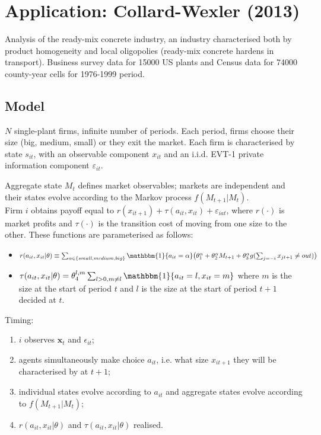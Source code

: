 \documentclass[11pt]{article}
\begin{document}
\section{Application: Collard-Wexler (2013)}

Analysis of the ready-mix concrete industry, an industry characterised both by product homogeneity and local oligopolies (ready-mix concrete hardens in transport).
Business survey data for 15000 US plants and Census data for 74000 county-year cells for 1976-1999 period.

\subsection*{Model}

$N$ single-plant firms, infinite number of periods. Each period, firms choose their size (big, medium, small) or they exit the market. Each firm is characterised by state $s_{it}$, with an observable component $x_{it}$ and an i.i.d. EVT-1 private information component $\varepsilon_{it}$.

Aggregate state $M_t$ defines market observables; markets are independent and their states evolve according to the Markov process $f(M_{t+1}| M_t)$. \\

Firm $i$ obtains payoff equal to $r(x_{it+1}) + \tau(a_{it},x_{it}) + \varepsilon_{iat}$, where $r(\cdot)$ is market profits and $\tau(\cdot)$ is the transition cost of moving from one size to the other. These functions are parameterised as follows:
\begin{itemize}
	\item $r(a_{it}, x_{it} | \theta) \equiv \sum_{\alpha \in \{small, medium, big\}} \mathbbm{1}\{a_{it} = \alpha \}
	\big(\theta^\alpha_1 + \theta^\alpha_2 M_{t+1} + \theta^\alpha_3 g(\sum_{j = -i} x_{j t+1} \neq out) \big)$
	\item $\tau(a_{it}, x_{it} | \theta) = \theta^{l,m}_4 \sum_{l > 0, m \neq l} \mathbbm{1} \{a_{it} = l, x_{it} = m\}$ where $m$ is the size at the start of period $t$ and $l$ is the size at the start of period $t+1$ decided at $t$.
\end{itemize}
Timing:
\begin{enumerate}
	\item $i$ observes $\mathbf{x}_t$ and $\epsilon_{it}$;
	\item agents simultaneously make choice $a_{it}$, i.e. what size $x_{it+1}$ they will be characterised by at $t+1$;
	\item individual states evolve according to $a_{it}$ and aggregate states evolve according to $f(M_{t+1} | M_t)$;
	\item $r(a_{it}, x_{it} | \theta)$ and $\tau(a_{it}, x_{it} | \theta)$ realised.
\end{enumerate}
\end{document}
